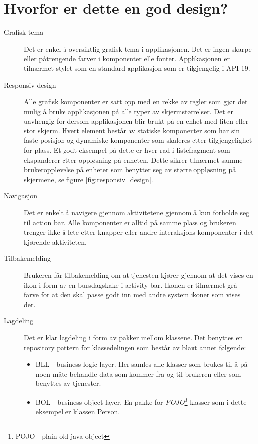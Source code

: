 \chapter{Hvorfor er dette en god design?}
\begin{description}
\item[Grafisk tema]
Det er enkel å oversiktlig grafisk tema i applikasjonen. Det er ingen skarpe eller påtrengende farver i komponenter elle fonter. Applikasjonen er tilnærmet stylet som en standard applikasjon som er tilgjengelig i API 19.

\item[Responsiv design]
Alle grafisk komponenter er satt opp med en rekke av regler som gjør det mulig å bruke applikasjonen på alle typer av skjermstørrelser. Det er uavhengig for dersom applikasjonen blir brukt på en enhet med liten eller stor skjerm. Hvert element består av statiske komponenter som har sin faste posisjon og dynamiske komponenter som skaleres etter tilgjengelighet for plass. Et godt eksempel på dette er hver rad i listefragment som ekspanderer etter oppløsning på enheten. Dette sikrer tilnærmet samme brukeropplevelse på enheter som benytter seg av større oppløsning på skjermene, se figure \ref{fig:responsiv_design}.

\item[Navigasjon]
Det er enkelt å navigere gjennom aktivitetene gjennom å kun forholde seg til action bar. Alle komponenter er alltid på samme plass og brukeren trenger ikke å lete etter knapper eller andre interaksjons komponenter i det kjørende aktiviteten.

\item[Tilbakemelding]
Brukeren får tilbakemelding om at tjenesten kjører gjennom at det vises en ikon i form av en bursdagskake i activity bar. Ikonen er tilnærmet grå farve for at den skal passe godt inn med andre system ikoner som vises der.

\item[Lagdeling]
Det er klar lagdeling i form av pakker mellom klassene. Det benyttes en repository pattern for klassedelingen som består av blant annet følgende:
\begin{itemize}
\item BLL - business logic layer. Her samles alle klasser som brukes til å på noen måte behandle data som kommer fra og til brukeren eller som benyttes av tjenester. 
\item BOL - business object layer. En pakke for \textit{POJO\footnote{POJO - plain old java object}} klasser som i dette eksempel er klassen Person.


\end{itemize}
\end{description}
